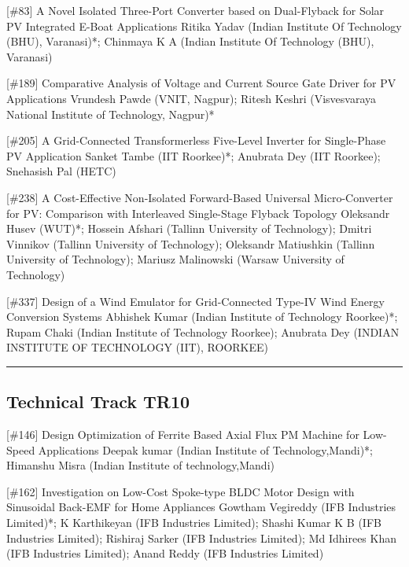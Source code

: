 {} \begin{abstract_online} {[\#83] A Novel Isolated Three-Port Converter based on Dual-Flyback for Solar PV Integrated E-Boat Applications} {} {Ritika Yadav (Indian Institute Of Technology (BHU), Varanasi)*; Chinmaya K A (Indian Institute Of Technology (BHU), Varanasi)} {}  \end{abstract_online} 
{} \begin{abstract_online} {[\#189] Comparative Analysis of Voltage and Current Source Gate Driver for PV Applications} {} {Vrundesh Pawde (VNIT, Nagpur); Ritesh Keshri (Visvesvaraya National Institute of Technology, Nagpur)*} {}  \end{abstract_online} 
{} \begin{abstract_online} {[\#205] A Grid-Connected Transformerless Five-Level Inverter for Single-Phase PV Application} {} {Sanket Tambe (IIT Roorkee)*; Anubrata  Dey (IIT Roorkee); Snehasish Pal (HETC)} {}  \end{abstract_online} 
{} \begin{abstract_online} {[\#238] A Cost-Effective Non-Isolated Forward-Based Universal Micro-Converter for PV: Comparison with Interleaved Single-Stage Flyback Topology} {} {Oleksandr Husev (WUT)*; Hossein Afshari (Tallinn University of Technology); Dmitri Vinnikov (Tallinn University of Technology); Oleksandr Matiushkin (Tallinn University of Technology); Mariusz Malinowski (Warsaw University of Technology)} {}  \end{abstract_online} 
{} \begin{abstract_online} {[\#337] Design of a Wind Emulator for Grid-Connected Type-IV Wind Energy Conversion Systems} {} {Abhishek Kumar (Indian Institute of Technology Roorkee)*; Rupam Chaki (Indian Institute of Technology Roorkee); Anubrata Dey (INDIAN INSTITUTE OF TECHNOLOGY (IIT),  ROORKEE)} {}  \end{abstract_online} 
\hrule  \subsection{Technical Track TR10}\nopagebreak {} \begin{abstract_online} {[\#146] Design Optimization of Ferrite Based Axial Flux PM Machine for Low-Speed Applications} {} {Deepak  kumar (Indian Institute of Technology,Mandi)*; Himanshu Misra (Indian Institute of technology,Mandi)} {}  \end{abstract_online} 
{} \begin{abstract_online} {[\#162] Investigation on Low-Cost Spoke-type BLDC Motor Design with Sinusoidal Back-EMF for Home Appliances} {} {Gowtham Vegireddy (IFB Industries Limited)*; K Karthikeyan (IFB Industries Limited); Shashi Kumar  K B (IFB Industries Limited); Rishiraj  Sarker (IFB Industries Limited); Md Idhirees  Khan (IFB Industries Limited); Anand Reddy (IFB Industries Limited)} {}  \end{abstract_online} 

